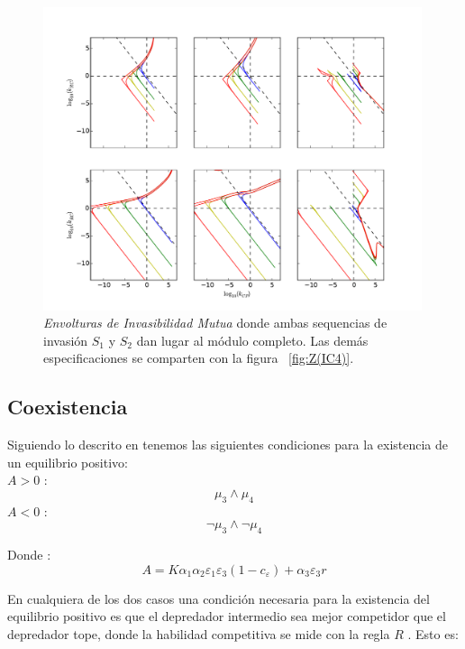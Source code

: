 \begin{figure}
  \centering
  \includegraphics[width = 0.99\textwidth]{./Plots/MutualInvAcGrGr.pdf}
  \caption[Env $I_M$]{\emph{Envolturas de Invasibilidad Mutua} donde ambas sequencias de invasi\'on $S_1$ y $S_2$ dan lugar al m\'odulo completo. Las dem\'as especificaciones se comparten con la figura ~\ref{fig:Z(IC4)}.}
  \label{fig:MutualInv}
\end{figure}


\subsection{Coexistencia}
Siguiendo lo descrito en \cite{holt1997theoretical} tenemos las siguientes condiciones para la existencia de un equilibrio positivo:\\
$A >0$ :
\begin{equation}
  \mu_3 \land \mu_4
\end{equation}
$A <0$ :
\begin{equation}
  \lnot \mu_3 \land \lnot \mu_4
\end{equation}
 
Donde :
\begin{equation}
  A = K \alpha_1 \alpha_2 \varepsilon_1 \varepsilon_3(1-c_\varepsilon) + \alpha_3\varepsilon_3 r
\end{equation}

En cualquiera de los dos casos una condici\'on necesaria para la existencia del equilibrio positivo es que el depredador intermedio sea mejor competidor que el depredador tope, donde la habilidad competitiva se mide con la regla $R$ \citep{holt1997theoretical,Tilman1990}. Esto es:

